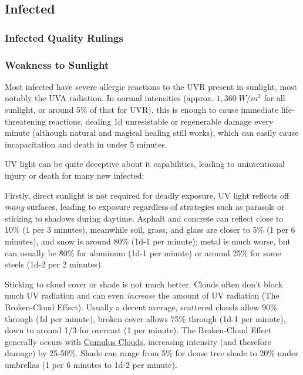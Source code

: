 \begin{multicols*}{3}
	\subsection{Infected}
	
	\subsubsection{Infected Quality Rulings}
	
	\subsubsection*{Weakness to Sunlight}
	
	Most infected have severe allergic reactions to the UVR present in sunlight, most notably the UVA radiation. In normal intensities (approx. $1,360\;W/m^2$ for all sunlight, or around 5\% of that for UVR), this is enough to cause immediate life-threatening reactions, dealing 1d unresistable or regenerable damage every minute (although natural and magical healing still works), which can easily cause incapacitation and death in under 5 minutes.
	
	UV light can be quite deceptive about it capabilities, leading to unintentional injury or death for many new infected:
	
	Firstly, direct sunlight is not required for deadly exposure, UV light reflects off \textit{many} surfaces, leading to exposure regardless of strategies such as parasols or sticking to shadows during daytime. Asphalt and concrete can reflect close to 10\% (1 per 3 minutes), meanwhile soil, grass, and glass are closer to 5\% (1 per 6 minutes), and snow is around 80\% (1d-1 per minute); metal is much worse, but can usually be \~80\% for aluminum (1d-1 per minute) or around 25\% for some steels (1d-2 per 2 minutes).
	
	Sticking to cloud cover or shade is not much better. Clouds often don't block much UV radiation and can even \textit{increase} the amount of UV radiation (The Broken-Cloud Effect). Usually a decent average, scattered clouds allow 90\% through (1d per minute), broken cover allows 75\% through (1d-1 per minute), down to around 1/3 for overcast (1 per minute). The Broken-Cloud Effect generally occurs with \href{https://en.wikipedia.org/wiki/Cumulus_cloud}{Cumulus Clouds}, increasing intensity (and therefore damage) by 25-50\%.	Shade can range from 5\% for dense tree shade to 20\% under umbrellas (1 per 6 minutes to 1d-2 per minute).
	

\end{multicols*}
